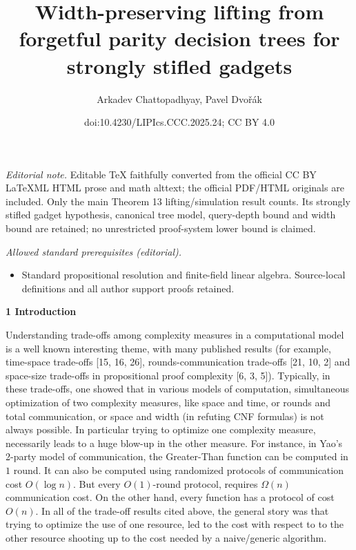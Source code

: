 \documentclass[10pt,a4paper]{article}
\title{Width-preserving lifting from forgetful parity decision trees for strongly stifled gadgets}
\author{Arkadev Chattopadhyay, Pavel Dvořák}
\date{doi:10.4230/LIPIcs.CCC.2025.24; CC BY 4.0}
\begin{document}
\maketitle
\noindent\textit{Editorial note.} Editable TeX faithfully converted from the official CC BY LaTeXML HTML prose and math alttext; the official PDF/HTML originals are included. Only the main Theorem 13 lifting/simulation result counts. Its strongly stifled gadget hypothesis, canonical tree model, query-depth bound and width bound are retained; no unrestricted proof-system lower bound is claimed.\par\medskip
\noindent\textit{Allowed standard prerequisites (editorial).}\begin{itemize}
\item Standard propositional resolution and finite-field linear algebra. Source-local definitions and all author support proofs retained.
\end{itemize}\medskip


\par\medskip\noindent\textbf{
1 Introduction}\par




Understanding trade-offs among complexity measures in a computational model is a well known interesting theme, with many published results (for example, time-space trade-offs [15, 16, 26], rounds-communication trade-offs [21, 10, 2] and space-size trade-offs in propositional proof complexity [6, 3, 5]). Typically, in these trade-offs, one showed that in various models of computation, simultaneous optimization of two complexity measures, like space and time, or rounds and total communication, or space and width (in refuting CNF formulas) is not always possible. In particular trying to optimize one complexity measure, necessarily leads to a huge blow-up in the other measure. For instance, in Yao’s 2-party model of communication, the Greater-Than function can be computed in $1$ round. It can also be computed using randomized protocols of communication cost $O(\log n)$. But every $O(1)$-round protocol, requires $\Omega(n)$ communication cost. On the other hand, every function has a protocol of cost $O(n)$. In all of the trade-off results cited above, the general story was that trying to optimize the use of one resource, led to the cost with respect to to the other resource shooting up to the cost needed by a naive/generic algorithm.\par
\end{document}
